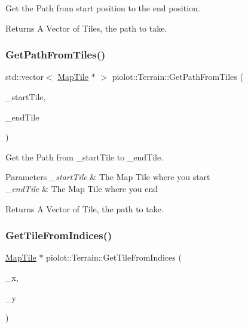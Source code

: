 Get the Path from start position to the end position. 

\begin{DoxyReturn}{Returns}
A Vector of Tiles, the path to take. 
\end{DoxyReturn}
\mbox{\label{classpiolot_1_1_terrain_af3294a6025d6e23f79ff8693ca67fb79}} 
\subsubsection{\texorpdfstring{Get\+Path\+From\+Tiles()}{GetPathFromTiles()}}
{\footnotesize\ttfamily std\+::vector$<$ \mbox{\hyperlink{classpiolot_1_1_map_tile}{Map\+Tile}} $\ast$ $>$ piolot\+::\+Terrain\+::\+Get\+Path\+From\+Tiles (\begin{DoxyParamCaption}\item[{\mbox{\hyperlink{classpiolot_1_1_map_tile}{Map\+Tile}} $\ast$}]{\+\_\+start\+Tile,  }\item[{\mbox{\hyperlink{classpiolot_1_1_map_tile}{Map\+Tile}} $\ast$}]{\+\_\+end\+Tile }\end{DoxyParamCaption})}



Get the Path from \+\_\+start\+Tile to \+\_\+end\+Tile. 


\begin{DoxyParams}{Parameters}
{\em \+\_\+start\+Tile} & The Map Tile where you start \\
\hline
{\em \+\_\+end\+Tile} & The Map Tile where you end \\
\hline
\end{DoxyParams}
\begin{DoxyReturn}{Returns}
A Vector of Tile, the path to take. 
\end{DoxyReturn}
\mbox{\label{classpiolot_1_1_terrain_a1dde3530579a5bcdbb35eec94dff49b5}} 
\subsubsection{\texorpdfstring{Get\+Tile\+From\+Indices()}{GetTileFromIndices()}}
{\footnotesize\ttfamily \mbox{\hyperlink{classpiolot_1_1_map_tile}{Map\+Tile}} $\ast$ piolot\+::\+Terrain\+::\+Get\+Tile\+From\+Indices (\begin{DoxyParamCaption}\item[{int}]{\+\_\+x,  }\item[{int}]{\+\_\+y }\end{DoxyParamCaption})}



